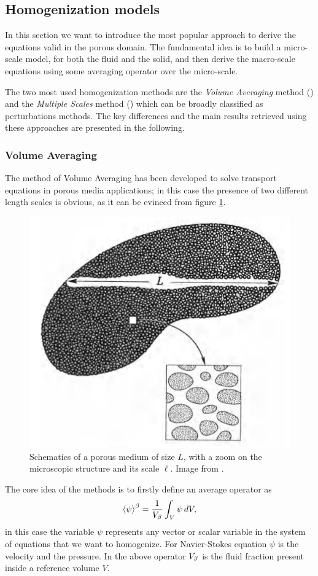 \subsection{Homogenization models}

In this section we want to introduce the most popular approach to derive the equations valid in the porous domain.
The fundamental idea is to build a micro-scale model, for both the fluid and the solid, and then derive the macro-scale equations using some averaging operator over the micro-scale.

The two most used homogenization methods are the \textit{Volume Averaging} method (\citet{whitaker2013method}) and the \textit{Multiple Scales} method (\citet{mei2010homogenization}) which can be broadly classified as perturbations methods. 
The key differences and the main results retrieved using these approaches are presented in the following.


\subsubsection{Volume Averaging}
\label{sec:vans}

The method of Volume Averaging has been developed to solve transport equations in porous media applications; in this case the presence of two different length scales is obvious, as it can be evinced from figure \ref{fig:porsystem}.
	
	\begin{figure}[h]
		\centering
		\includegraphics[width=0.5\linewidth]{chapter_1/por_system}
		\caption{Schematics of a porous medium of size $L$, with a zoom on the microscopic structure and its scale $\ell$. Image from \citet{whitaker2013method}.}
		\label{fig:porsystem}
	\end{figure}

The core idea of the methods is to firstly define an average operator as $${\left< \psi \right>}^{\beta} = \dfrac{1}{V_\beta} \displaystyle\int_{V} \psi \, dV,$$ in this case the variable $\psi$ represents any vector or scalar variable in the system of equations that we want to homogenize. For Navier-Stokes equation $\psi$ is the velocity and the pressure. In the above operator $V_\beta$ is the fluid fraction present inside a reference volume $V$.

